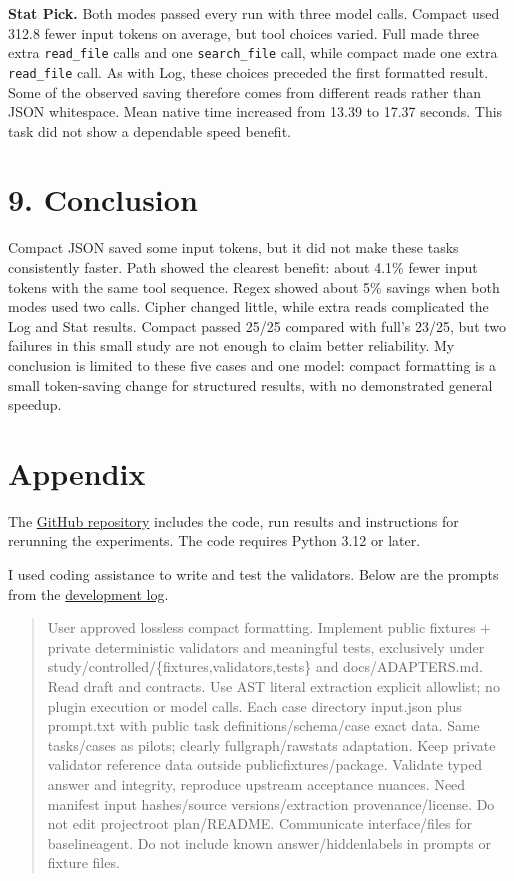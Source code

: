 \documentclass[10pt,letterpaper]{article}
\begin{document}
\textbf{Stat Pick.} Both modes passed every run with three model calls. Compact used 312.8 fewer input tokens on average, but tool choices varied. Full made three extra \texttt{read\_file} calls and one \texttt{search\_file} call, while compact made one extra \texttt{read\_file} call. As with Log, these choices preceded the first formatted result. Some of the observed saving therefore comes from different reads rather than JSON whitespace. Mean native time increased from 13.39 to 17.37 seconds. This task did not show a dependable speed benefit.

\section*{9. Conclusion}

Compact JSON saved some input tokens, but it did not make these tasks consistently faster. Path showed the clearest benefit: about 4.1\% fewer input tokens with the same tool sequence. Regex showed about 5\% savings when both modes used two calls. Cipher changed little, while extra reads complicated the Log and Stat results. Compact passed 25/25 compared with full's 23/25, but two failures in this small study are not enough to claim better reliability. My conclusion is limited to these five cases and one model: compact formatting is a small token-saving change for structured results, with no demonstrated general speedup.

\section*{Appendix}

The \href{https://github.com/a-little-hoof/580-final}{GitHub repository} includes the code, run results and instructions for rerunning the experiments. The code requires Python 3.12 or later.

I used coding assistance to write and test the validators. Below are the prompts from the \href{https://github.com/a-little-hoof/580-final/blob/main/study/controlled/development/prompts.jsonl}{development log}.

\begin{quote}\small
User approved lossless compact formatting. Implement public fixtures + private deterministic validators and meaningful tests, exclusively under study/controlled/\{fixtures,validators,tests\} and docs/ADAPTERS.md. Read draft and contracts. Use AST literal extraction explicit allowlist; no plugin execution or model calls. Each case directory input.json plus prompt.txt with public task definitions/schema/case exact data. Same tasks/cases as pilots; clearly fullgraph/rawstats adaptation. Keep private validator reference data outside publicfixtures/package. Validate typed answer and integrity, reproduce upstream acceptance nuances. Need manifest input hashes/source versions/extraction provenance/license. Do not edit projectroot plan/README. Communicate interface/files for baselineagent. Do not include known answer/hiddenlabels in prompts or fixture files.
\end{quote}
\end{document}
